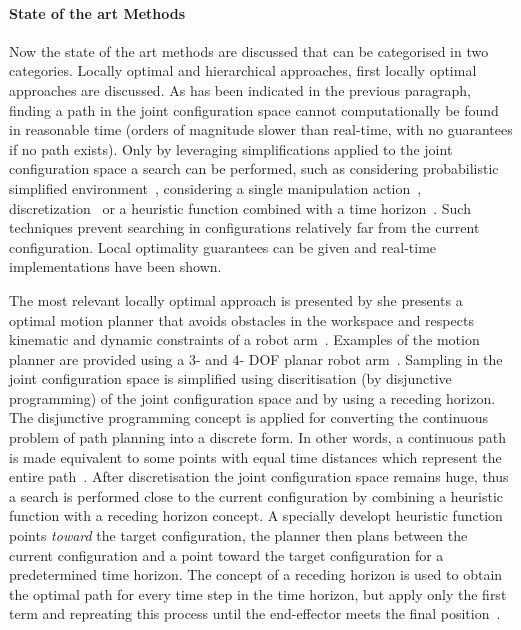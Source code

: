 \paragraph{State of the art Methods}
Now the state of the art methods are discussed that can be categorised in two categories. Locally optimal and hierarchical approaches, first locally optimal approaches are discussed. As has been indicated in the previous paragraph, finding a path in the joint configuration space cannot computationally be found in reasonable time (orders of magnitude slower than real-time, with no guarantees if no path exists). Only by leveraging simplifications applied to the joint configuration space a search can be performed, such as considering probabilistic simplified environment~\cite{vandenberg_path_2009}, considering a single manipulation action~\cite{berenson_manipulation_2009}, discretization~\cite{sabbaghnovin_optimal_2016} or a heuristic function combined with a time horizon~\cite{sabbaghnovin_optimal_2016}. Such techniques prevent searching in configurations relatively far from the current configuration. Local optimality guarantees can be given and real-time implementations have been shown.\bs

The most relevant locally optimal approach is presented by \citeauthor{sabbaghnovin_model_2021} she presents a optimal motion planner that avoids obstacles in the workspace and respects kinematic and dynamic constraints of a robot arm~\cite{sabbaghnovin_optimal_2016}. Examples of the motion planner are provided using a 3- and 4- \ac{DOF} planar robot arm~\cite{sabbaghnovin_optimal_2016}. Sampling in the joint configuration space is simplified using discritisation (by disjunctive programming) of the joint configuration space and by using a receding horizon. The disjunctive programming concept is applied for converting the continuous problem of path planning into a discrete form. In other words, a continuous path is made equivalent to some points with equal time distances which represent the entire path~\cite{sabbaghnovin_optimal_2016}. After discretisation the joint configuration space remains huge, thus a search is performed close to the current configuration by combining a heuristic function with a receding horizon concept. A specially developt heuristic function points \textit{toward} the target configuration, the planner then plans between the current configuration and a point toward the target configuration for a predetermined time horizon. The concept of a receding horizon is used to obtain the optimal path for every time step in the time horizon, but apply only the first term and repreating this process until the end-effector meets the final position~\cite{sabbaghnovin_optimal_2016}.\bs

